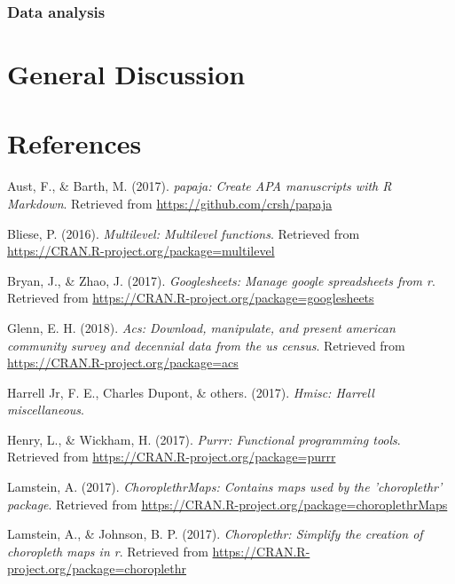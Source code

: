 \documentclass[english,man]{apa6}
\theoremstyle{definition}
\theoremstyle{definition}
\theoremstyle{definition}
\theoremstyle{remark}
\begin{document}
\subsubsection{Data analysis}\label{data-analysis-1}

\section{General Discussion}\label{general-discussion}

\newpage

\section{References}\label{references}

\setlength{\parindent}{-0.5in} \setlength{\leftskip}{0.5in}

\hypertarget{refs}{}
\hypertarget{ref-R-papaja}{}
Aust, F., \& Barth, M. (2017). \emph{papaja: Create APA manuscripts with
R Markdown}. Retrieved from \url{https://github.com/crsh/papaja}

\hypertarget{ref-R-multilevel}{}
Bliese, P. (2016). \emph{Multilevel: Multilevel functions}. Retrieved
from \url{https://CRAN.R-project.org/package=multilevel}

\hypertarget{ref-R-googlesheets}{}
Bryan, J., \& Zhao, J. (2017). \emph{Googlesheets: Manage google
spreadsheets from r}. Retrieved from
\url{https://CRAN.R-project.org/package=googlesheets}

\hypertarget{ref-R-acs}{}
Glenn, E. H. (2018). \emph{Acs: Download, manipulate, and present
american community survey and decennial data from the us census}.
Retrieved from \url{https://CRAN.R-project.org/package=acs}

\hypertarget{ref-R-Hmisc}{}
Harrell Jr, F. E., Charles Dupont, \& others. (2017). \emph{Hmisc:
Harrell miscellaneous}.

\hypertarget{ref-R-purrr}{}
Henry, L., \& Wickham, H. (2017). \emph{Purrr: Functional programming
tools}. Retrieved from \url{https://CRAN.R-project.org/package=purrr}

\hypertarget{ref-R-choroplethrMaps}{}
Lamstein, A. (2017). \emph{ChoroplethrMaps: Contains maps used by the
'choroplethr' package}. Retrieved from
\url{https://CRAN.R-project.org/package=choroplethrMaps}

\hypertarget{ref-R-choroplethr}{}
Lamstein, A., \& Johnson, B. P. (2017). \emph{Choroplethr: Simplify the
creation of choropleth maps in r}. Retrieved from
\url{https://CRAN.R-project.org/package=choroplethr}
\end{document}
